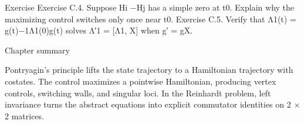 \begin{statementbox}{Exercise}
Exercise C.4. Suppose Hi −Hj has a simple zero at t0. Explain why the maximizing control switches only once near t0. Exercise C.5. Verify that Λ1(t) = g(t)−1Λ1(0)g(t) solves Λ′1 = [Λ1, X] when g′ = gX.
\end{statementbox}

\begin{insightbox}{Chapter summary}
\end{insightbox}

Pontryagin’s principle lifts the state trajectory to a Hamiltonian trajectory with costates. The control maximizes a pointwise Hamiltonian, producing vertex controls, switching walls, and singular loci. In the Reinhardt problem, left invariance turns the abstract equations into explicit commutator identities on 2 × 2 matrices.

